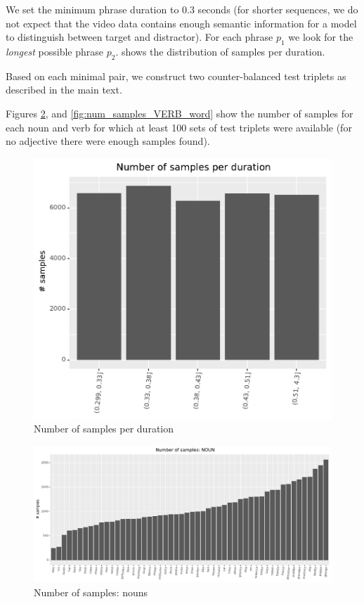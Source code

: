 We set the minimum phrase duration to 0.3 seconds (for shorter sequences, we do not expect that the video data contains enough semantic information for a model to distinguish between target and distractor). For each phrase $p_1$ we look for the \textit{longest} possible phrase $p_2$.  shows the distribution of samples per duration.

Based on each minimal pair, we construct two counter-balanced test triplets as described in the main text.

Figures \ref{fig:num_samples_NOUN_word}, and \ref{fig:num_samples_VERB_word} show the number of samples for each noun and verb for which at least 100 sets of test triplets were available (for no adjective there were enough samples found).


\begin{figure}
  \centering
  \includegraphics[width=\columnwidth]{results/targeted_triplets/num_samples_per_duration.pdf}
  \caption{Number of samples per duration}
  \label{fig:num_samples_vs_duration}
\end{figure}


\begin{figure}
  \centering
  \includegraphics[width=\textwidth]{results/targeted_triplets/num_samples_per_word_NOUN.pdf}
  \caption{Number of samples: nouns}
  \label{fig:num_samples_NOUN_word}
\end{figure}

